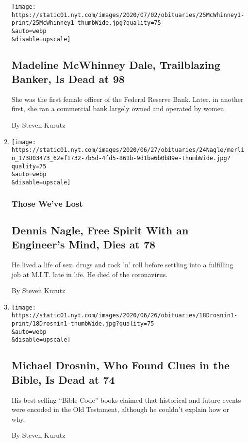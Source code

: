 \begin{enumerate}
  \texttt{[image: https://static01.nyt.com/images/2020/07/02/obituaries/25McWhinney1-print/25McWhinney1-thumbWide.jpg?quality=75\\\&auto=webp\\\&disable=upscale]}

  \hypertarget{madeline-mcwhinney-dale-trailblazing-banker-is-dead-at-98}{%
  \subsection{Madeline McWhinney Dale, Trailblazing Banker, Is Dead at
  98}\label{madeline-mcwhinney-dale-trailblazing-banker-is-dead-at-98}}

  She was the first female officer of the Federal Reserve Bank. Later,
  in another first, she ran a commercial bank largely owned and operated
  by women.

  By Steven Kurutz
\item
  \href{/2020/06/25/science/dennis-nagle-dead-coronavirus.html}{}

  \texttt{[image: https://static01.nyt.com/images/2020/06/27/obituaries/24Nagle/merlin\_173803473\_62ef1732-7b5d-4fd5-861b-9d1ba6b0b89e-thumbWide.jpg?quality=75\\\&auto=webp\\\&disable=upscale]}

  \hypertarget{those-weve-lost-3}{%
  \subsubsection{Those We've Lost}\label{those-weve-lost-3}}

  \hypertarget{dennis-nagle-free-spirit-with-an-engineers-mind-dies-at-78}{%
  \subsection{Dennis Nagle, Free Spirit With an Engineer's Mind, Dies at
  78}\label{dennis-nagle-free-spirit-with-an-engineers-mind-dies-at-78}}

  He lived a life of sex, drugs and rock 'n' roll before settling into a
  fulfilling job at M.I.T. late in life. He died of the coronavirus.

  By Steven Kurutz
\item
  \href{/2020/06/19/books/michael-drosnin-dead.html}{}

  \texttt{[image: https://static01.nyt.com/images/2020/06/26/obituaries/18Drosnin1-print/18Drosnin1-thumbWide.jpg?quality=75\\\&auto=webp\\\&disable=upscale]}

  \hypertarget{michael-drosnin-who-found-clues-in-the-bible-is-dead-at-74}{%
  \subsection{Michael Drosnin, Who Found Clues in the Bible, Is Dead at
  74}\label{michael-drosnin-who-found-clues-in-the-bible-is-dead-at-74}}

  His best-selling ``Bible Code'' books claimed that historical and
  future events were encoded in the Old Testament, although he couldn't
  explain how or why.

  By Steven Kurutz
\end{enumerate}

